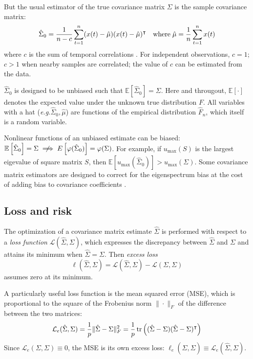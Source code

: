 But the usual estimator of the true covariance matrix $\Sigma$ is  the sample covariance matrix:
\begin{equation}
\hat\Sigma_0 =  \frac 1 {n-c} \sum\limits_{t=1}^n (x(t) -\hat\mu) (x(t) - \hat\mu)^\intercal
\quad\mbox{where}\;
\hat\mu = \frac 1 n \sum\limits_{t=1}^n x(t)
\end{equation}
where $c$ is the sum of temporal correlations . For independent observations, $c=1$;  $c>1$ when nearby samples are correlated; the value of $c$ can be estimated from the data.

$\hat\Sigma_0$ is designed to be unbiased such that $\mathbb E\left[\hat\Sigma_0\right]=\Sigma$.
Here and througout, $\mathbb E[\cdot]$ denotes the expected value under the  unknown true distribution $F$. All variables with a hat (\emph{e.g.}\;$\hat \Sigma_0,\hat \mu$) are functions of the empirical distribution $\hat F_n$, which itself is a random variable.

Nonlinear functions of an unbiased estimate can be biased: $\mathbb E\left[\hat\Sigma_0\right]=\Sigma \centernot\implies  E\left[\varphi(\hat\Sigma_0)\right]=\varphi(\Sigma)$.  For example, if $u_{\max}(S)$ is the largest eigevalue of square matrix $S$, then $\mathbb E\left[u_{\max}(\hat\Sigma_0)\right] > u_{\max}(\Sigma)$. Some covariance matrix estimators are designed to correct for the eigenspectrum bias at the cost of adding bias to covariance coefficients \citep{Ledoit:2004}.




\subsection{Loss and risk}
The optimization of a covariance matrix estimate $\hat\Sigma$ is performed with respect to a \emph{loss function} $\mathcal L(\hat\Sigma,\Sigma)$, which expresses the discrepancy between $\hat\Sigma$ and $\Sigma$ and attains its minimum when $\hat\Sigma=\Sigma$.  
Then \emph{excess loss}  
\begin{equation}
\ell(\hat\Sigma,\Sigma) = \mathcal L(\hat\Sigma,\Sigma)-\mathcal L(\Sigma,\Sigma)
\end{equation}
assumes zero at its minimum.

A particularly useful loss function is the mean squared error (MSE), which is proportional to the square of the Frobenius  norm $\|\cdot\|_F$ of the difference between the two matrices: 
\begin{equation}\label{eq:MSE}
\mathcal L_e(\hat\Sigma,\Sigma) =\frac 1 p \|\hat\Sigma-\Sigma\|_F^2 = \frac 1 p \operatorname{tr}\left((\hat \Sigma-\Sigma)(\hat\Sigma-\Sigma)^\intercal\right)
\end{equation}
Since $\mathcal L_e(\Sigma,\Sigma) \equiv 0$, the MSE is its own excess loss: $\ell_e(\hat\Sigma,\Sigma) \equiv \mathcal L_e(\hat\Sigma,\Sigma)$.

